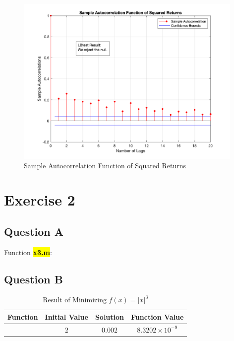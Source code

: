 \documentclass{report}
\begin{document}
\begin{figure}[H]
	\centering
	\includegraphics[width = 11cm]{fig/1c32}
	\caption{Sample Autocorrelation Function of Squared Returns} 
\end{figure}




\section*{Exercise 2}

\subsection*{Question A}
Function \hl{\textbf{x3.m}}:




\subsection*{Question B}

\begin{table}[H]
	\begin{center}
		\caption{Result of Minimizing $f(x)=|x|^3$}
		\label{tab:table1}
		\vspace{2mm}
		\begin{tabular}{c|c|c|c} 
						
			\textbf{Function} & \textbf{Initial Value}& \textbf{Solution} & \textbf{Function Value}\\
			\hline
			
			\text{fminunc} &  $2$ & 	$0.002$ & 	$8.3202\times 10^{-9}$
	\end{tabular}
	\end{center}
\end{table}
\end{document}
